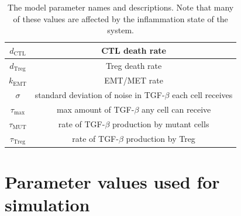\documentclass[11pt, a4paper, preprint]{article}
\begin{document}
\begin{table}[H]
\begin{center}
\begin{tabular}{|| c | c||}
  \hline
  $d_\text{CTL}$ & CTL death rate \\ 
  \hline
  $d_\text{Treg}$ & Treg death rate \\ 
  \hline
  $k_\text{EMT}$ & EMT/MET rate  \\
  \hline
  $\sigma$ & standard deviation of noise in TGF-$\beta$ each cell receives  \\
  \hline
 $\tau_\text{max}$ & max amount of TGF-$\beta$ any cell can receive \\
  \hline 
 $\tau_\text{MUT}$ & rate of TGF-$\beta$ production by mutant cells\\
  \hline
 $\tau_\text{Treg}$ & rate of TGF-$\beta$ production by Treg\\
  \hline
\end{tabular}
  \caption{The model parameter names and descriptions. Note that many of these values are affected by the inflammation state of the system.}
\end{center}
\end{table}


\section{Parameter values used for simulation}
\end{document}
